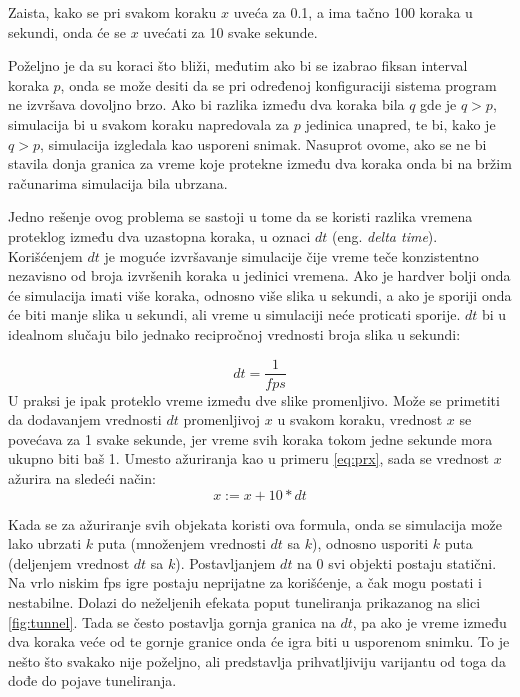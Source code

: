 \documentclass[12pt,oneside]{memoir}
\begin{document}
Zaista, kako se pri svakom koraku $x$ uveća za 0.1, a ima tačno 100 koraka u sekundi, onda će se $x$ uvećati za 10 svake sekunde.

Poželjno je da su koraci što bliži, međutim ako bi se izabrao fiksan interval koraka $p$, onda se može desiti
da se pri određenoj konfiguraciji sistema program ne izvršava dovoljno brzo. 
Ako bi razlika između dva koraka bila $q$ gde je $q > p$, 
simulacija bi u svakom koraku napredovala za $p$ jedinica unapred, te bi,
kako je $q > p$, simulacija izgledala kao usporeni snimak.
Nasuprot ovome, ako se ne bi stavila donja granica za vreme koje protekne između dva koraka onda bi na bržim računarima
simulacija bila ubrzana. 

Jedno rešenje ovog problema se sastoji u tome da se koristi 
razlika vremena proteklog između dva uzastopna koraka, u oznaci $dt$ (eng. {\em delta time}).
Korišćenjem $dt$ je moguće izvršavanje simulacije čije vreme teče konzistentno nezavisno od broja izvršenih koraka u 
jedinici vremena. Ako je hardver bolji onda će simulacija imati više koraka, odnosno više slika u sekundi, a ako je 
sporiji onda će biti manje slika u sekundi, ali vreme u simulaciji neće proticati sporije.
$dt$ bi u idealnom slučaju bilo jednako recipročnoj vrednosti broja slika u sekundi:


$$dt = \frac{1}{fps}$$
U praksi je ipak proteklo vreme između dve slike promenljivo.
Može se primetiti da dodavanjem vrednosti $dt$ promenljivoj $x$ u svakom koraku, vrednost $x$ se povećava 
za 1 svake sekunde, jer vreme svih koraka tokom jedne sekunde mora ukupno biti baš 1.
Umesto ažuriranja kao u primeru \ref{eq:prx}, sada se vrednost $x$ ažurira na sledeći način:
\begin{equation}
	\label{eq:prx2}
	x:= x + 10 * dt
\end{equation}

Kada se za ažuriranje svih objekata koristi ova formula, onda se simulacija može lako ubrzati $k$ puta
(množenjem vrednosti $dt$ sa $k$), odnosno usporiti $k$ puta (deljenjem vrednost $dt$ sa $k$).
Postavljanjem $dt$ na 0 svi objekti postaju statični. 
Na vrlo niskim fps igre postaju neprijatne za korišćenje, a čak mogu postati i nestabilne.
Dolazi do neželjenih efekata poput tuneliranja prikazanog na slici \ref{fig:tunnel}.
Tada se često postavlja gornja granica na $dt$, pa 
ako je vreme između dva koraka veće od te gornje granice onda će igra biti u usporenom snimku.
To je nešto što svakako nije poželjno, ali predstavlja prihvatljiviju varijantu od toga da dođe do pojave tuneliranja.
\end{document}
